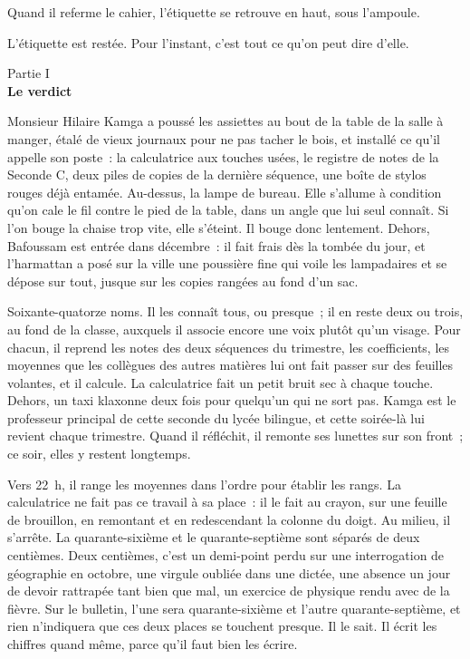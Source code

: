 \documentclass[10.5pt,twoside,openright]{book}
\newcommand{\partie}[2]{\cleardoublepage\thispagestyle{empty}\vspace*{\fill}\begin{center}{\large\color{gris}Partie #2}\\[1.2em]{\Huge\bfseries #1}\end{center}\vspace*{\fill}\cleardoublepage\markboth{}{}}
\newcommand{\chapitre}[2]{\cleardoublepage\markright{#2}\thispagestyle{plain}\vspace*{2.2cm}{\noindent\color{accent}\fontsize{54}{54}\selectfont\bfseries #1}\par\vspace{0.5em}{\noindent\LARGE\bfseries #2\par}\vspace{1.6em}\noindent\ignorespaces}
\begin{document}
Quand il referme le cahier, l’étiquette se retrouve en haut, sous l’ampoule.

L’étiquette est restée. Pour l’instant, c’est tout ce qu’on peut dire d’elle.


\partie{Le verdict}{I}

\chapitre{1}{Le rang}

Monsieur Hilaire Kamga a poussé les assiettes au bout de la table de la salle à manger, étalé de vieux journaux pour ne pas tacher le bois, et installé ce qu’il appelle son poste : la calculatrice aux touches usées, le registre de notes de la Seconde C, deux piles de copies de la dernière séquence, une boîte de stylos rouges déjà entamée. Au-dessus, la lampe de bureau. Elle s’allume à condition qu’on cale le fil contre le pied de la table, dans un angle que lui seul connaît. Si l’on bouge la chaise trop vite, elle s’éteint. Il bouge donc lentement. Dehors, Bafoussam est entrée dans décembre : il fait frais dès la tombée du jour, et l’harmattan a posé sur la ville une poussière fine qui voile les lampadaires et se dépose sur tout, jusque sur les copies rangées au fond d’un sac.

Soixante-quatorze noms. Il les connaît tous, ou presque ; il en reste deux ou trois, au fond de la classe, auxquels il associe encore une voix plutôt qu’un visage. Pour chacun, il reprend les notes des deux séquences du trimestre, les coefficients, les moyennes que les collègues des autres matières lui ont fait passer sur des feuilles volantes, et il calcule. La calculatrice fait un petit bruit sec à chaque touche. Dehors, un taxi klaxonne deux fois pour quelqu’un qui ne sort pas. Kamga est le professeur principal de cette seconde du lycée bilingue, et cette soirée-là lui revient chaque trimestre. Quand il réfléchit, il remonte ses lunettes sur son front ; ce soir, elles y restent longtemps.

Vers 22 h, il range les moyennes dans l’ordre pour établir les rangs. La calculatrice ne fait pas ce travail à sa place : il le fait au crayon, sur une feuille de brouillon, en remontant et en redescendant la colonne du doigt. Au milieu, il s’arrête. La quarante-sixième et le quarante-septième sont séparés de deux centièmes. Deux centièmes, c’est un demi-point perdu sur une interrogation de géographie en octobre, une virgule oubliée dans une dictée, une absence un jour de devoir rattrapée tant bien que mal, un exercice de physique rendu avec de la fièvre. Sur le bulletin, l’une sera quarante-sixième et l’autre quarante-septième, et rien n’indiquera que ces deux places se touchent presque. Il le sait. Il écrit les chiffres quand même, parce qu’il faut bien les écrire.
\end{document}
